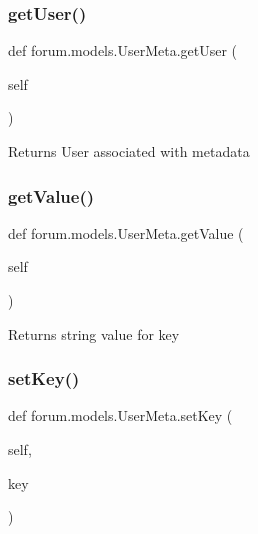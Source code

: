 \subsubsection{\texorpdfstring{get\+User()}{getUser()}}
{\footnotesize\ttfamily def forum.\+models.\+User\+Meta.\+get\+User (\begin{DoxyParamCaption}\item[{}]{self }\end{DoxyParamCaption})}

\begin{DoxyReturn}{Returns}
User associated with metadata 
\end{DoxyReturn}
\mbox{\label{classforum_1_1models_1_1_user_meta_a7ecc4d5bfadd1c1889a00097d295178d}} 
\subsubsection{\texorpdfstring{get\+Value()}{getValue()}}
{\footnotesize\ttfamily def forum.\+models.\+User\+Meta.\+get\+Value (\begin{DoxyParamCaption}\item[{}]{self }\end{DoxyParamCaption})}

\begin{DoxyReturn}{Returns}
string value for key 
\end{DoxyReturn}
\mbox{\label{classforum_1_1models_1_1_user_meta_a8ef75719439f8dc2ef994a5070a3d913}} 
\subsubsection{\texorpdfstring{set\+Key()}{setKey()}}
{\footnotesize\ttfamily def forum.\+models.\+User\+Meta.\+set\+Key (\begin{DoxyParamCaption}\item[{}]{self,  }\item[{}]{key }\end{DoxyParamCaption})}


